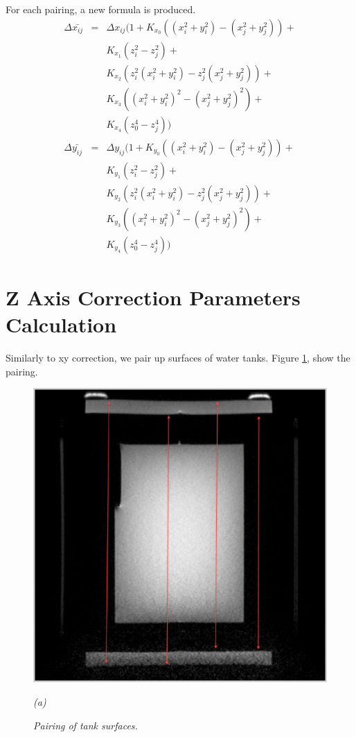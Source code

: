 For each pairing, a new formula is produced.
\begin{eqnarray} 
  \Delta{\bar{x_{ij}}} & = & \Delta{x_{ij}}(1 + K_{x_0}((x_i^2 + y_i^2) - (x_j^2 + y_j^2)) + \nonumber\\
  & & K_{x_1}(z_i^2 - z_j^2) + \nonumber\\
  & & K_{x_2}(z_i^2(x_i^2 + y_i^2)- z_j^2(x_j^2 + y_j^2)) + \nonumber\\
  & & K_{x_3}((x_i^2 + y_i^2)^2 - (x_j^2 + y_j^2)^2) + \nonumber\\
  & & K_{x_4}(z_0^4 - z_j^4)) \\
  \Delta{\bar{y_{ij}}} & = & \Delta{y_{ij}}(1 + K_{y_0}((x_i^2 + y_i^2) - (x_j^2 + y_j^2)) + \nonumber\\
  & & K_{y_1}(z_i^2 - z_j^2) + \nonumber\\
  & & K_{y_2}(z_i^2(x_i^2 + y_i^2)- z_j^2(x_j^2 + y_j^2)) + \nonumber\\
  & & K_{y_3}((x_i^2 + y_i^2)^2 - (x_j^2 + y_j^2)^2) + \nonumber\\
  & & K_{y_4}(z_0^4 - z_j^4))
\end{eqnarray}

\section{Z Axis Correction Parameters Calculation}

Similarly to xy correction, we pair up surfaces of water tanks. Figure \ref{fig:correction_surface_pairing}, 
show the pairing.

\begin{figure}[htb]
  \begin{minipage}[b]{0.8\linewidth}
    \centering
    \centerline{\mbox{\includegraphics[width=0.8\linewidth]{parameters/images/surface_pairing_z.eps}}}
    \centerline{\emph{(a)}}
  \end{minipage}
  \caption{\emph{Pairing of tank surfaces. }}
  \label{fig:correction_surface_pairing}
\end{figure}

